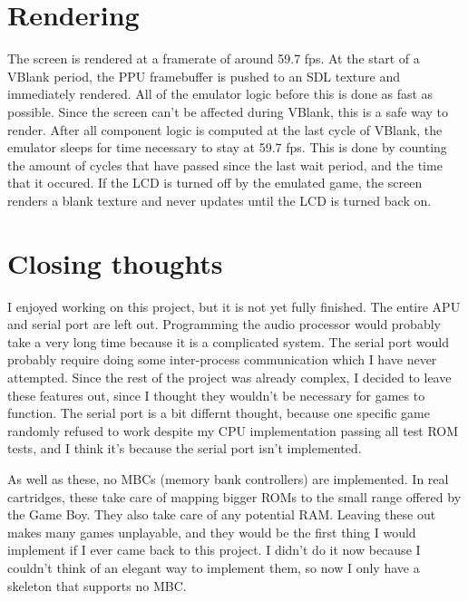 \documentclass{article}
\begin{document}
    \section{Rendering}
        The screen is rendered at a framerate of around 59.7 fps. At the start
        of a VBlank period, the PPU framebuffer is pushed to an SDL texture
        and immediately rendered. All of the emulator logic before this is done
        as fast as possible. Since the screen can't be affected during VBlank,
        this is a safe way to render. After all component logic is computed
        at the last cycle of VBlank, the emulator sleeps for time necessary
        to stay at 59.7 fps. This is done by counting the amount of cycles
        that have passed since the last wait period, and the time that it
        occured. If the LCD is turned off by the emulated game, the screen
        renders a blank texture and never updates until the LCD is turned back
        on.

    \section{Closing thoughts}
        I enjoyed working on this project, but it is not yet fully finished.
        The entire APU and serial port are left out. Programming the audio
        processor would probably take a very long time because it is a
        complicated system. The serial port would probably require doing
        some inter-process communication which I have never attempted. Since
        the rest of the project was already complex, I decided to leave these
        features out, since I thought they wouldn't be necessary for games to
        function. The serial port is a bit differnt thought, because one
        specific game randomly refused to work despite my CPU implementation
        passing all test ROM tests, and I think it's because the serial port
        isn't implemented.

        As well as these, no MBCs (memory bank controllers) are implemented.
        In real cartridges, these take care of mapping bigger ROMs to the small
        range offered by the Game Boy. They also take care of any potential RAM.
        Leaving these out makes many games unplayable, and they would be the
        first thing I would implement if I ever came back to this project.
        I didn't do it now because I couldn't think of an elegant way to
        implement them, so now I only have a skeleton that supports no MBC.
\end{document}
